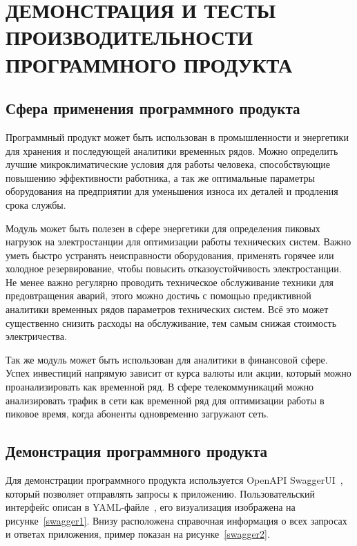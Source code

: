 \section{ДЕМОНСТРАЦИЯ И ТЕСТЫ ПРОИЗВОДИТЕЛЬНОСТИ ПРОГРАММНОГО ПРОДУКТА}

\subsection{Сфера применения программного продукта}

Программный продукт может быть использован в промышленности и энергетики для хранения и последующей аналитики временных рядов. Можно определить лучшие микроклиматические условия для работы человека, способствующие повышению эффективности работника, а так же оптимальные параметры оборудования на предприятии для уменьшения износа их деталей и продления срока службы.

Модуль может быть полезен в сфере энергетики для определения пиковых нагрузок на электростанции для оптимизации работы технических систем. Важно уметь быстро устранять неисправности оборудования, применять горячее или холодное резервирование, чтобы повысить отказоустойчивость электростанции. Не менее важно регулярно проводить техническое обслуживание техники для предовтращения аварий, этого можно достичь с помощью предиктивной аналитики временных рядов параметров технических систем. Всё это может существенно снизить расходы на обслуживание, тем самым снижая стоимость электричества.

Так же модуль может быть использован для аналитики в финансовой сфере. Успех инвестиций напрямую зависит от курса валюты или акции, который можно проанализировать как временной ряд. В сфере телекоммуникаций можно анализировать трафик в сети как временной ряд для оптимизации работы в пиковое время, когда абоненты одновременно загружают сеть.

\subsection{Демонстрация программного продукта}

Для демонстрации программного продукта используется OpenAPI SwaggerUI~\cite{OpenAPI,swaggerui}, который позволяет отправлять запросы к приложению. Пользовательский интерфейс описан в YAML-файле~\cite{swagger-data-types}, его визуализация изображена на рисунке~\ref{swagger1}. Внизу расположена справочная информация о всех запросах и ответах приложения, пример показан на рисунке~\ref{swagger2}.

